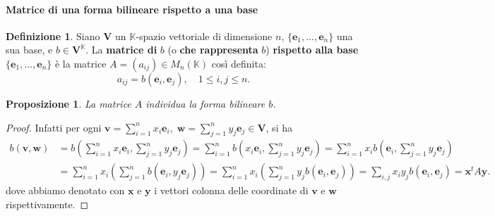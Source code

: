 \documentclass{article}
\theoremstyle{plain}
\newtheorem{prop}[thm]{Proposizione}
\theoremstyle{definition}
\newtheorem{defn}{Definizione}[section]
\theoremstyle{remark}
\begin{document}
\vspace{10pt}

\paragraph{Matrice di una forma bilineare rispetto a una base}
\begin{bxthm}
\begin{defn}
Siano $\mathbf{V}$ un $\mathbb{K}$-spazio vettoriale di dimensione $n$, $\{\mathbf{e}_1, \ldots, \mathbf{e}_n\}$ una sua base, 
e $b\in\mathbf{V}^{\mathbb{K}}$. 
La \textbf{matrice di} $b$ (o \textbf{che rappresenta} $b$) \textbf{rispetto alla base} $\{\mathbf{e}_1, \ldots, \mathbf{e}_n\}$ 
è la matrice $A = (a_{ij}) \in M_n(\mathbb{K})$ così definita:
\[
a_{ij} = b(\mathbf{e}_i, \mathbf{e}_j), \quad 1 \leq i,j \leq n.
\]    
\end{defn}
\end{bxthm}

\vspace{10pt}

\begin{bxthm}
\begin{prop}
La matrice $A$ individua la forma bilineare $b$.    
\end{prop}
\end{bxthm}
\begin{proof}
Infatti per ogni $\mathbf{v} = \sum_{i=1}^{n}x_i \mathbf{e}_i,\; \mathbf{w} = \sum_{j=1}^{n}y_j \mathbf{e}_j\in\mathbf{V}$,
si ha
\begin{align*}
b(\mathbf{v}, \mathbf{w}) &= b\left(\sum_{i=1}^{n}x_i \mathbf{e}_i, \sum_{j=1}^{n}y_j \mathbf{e}_j\right)=\sum_{i=1}^{n}b\left(x_i\mathbf{e}_i,\sum_{j=1}^{n}y_j \mathbf{e}_j\right)=\sum_{i=1}^{n}x_ib\left(\mathbf{e}_i,\sum_{j=1}^{n}y_j \mathbf{e}_j\right)\\
&=\sum_{i=1}^{n}x_i\left(\sum_{j=1}^{n}b\left(\mathbf{e}_i,y_j \mathbf{e}_j\right)\right)=\sum_{i=1}^{n}x_i\left(\sum_{j=1}^{n}y_jb\left(\mathbf{e}_i, \mathbf{e}_j\right)\right)= \sum_{i,j} x_i y_j b(\mathbf{e}_i, \mathbf{e}_j) = \mathbf{x}^t A \mathbf{y}.
\end{align*}
dove abbiamo denotato con $\mathbf{x}$ e $\mathbf{y}$ i vettori colonna delle coordinate di $\mathbf{v}$ e $\mathbf{w}$ rispettivamente.    
\end{proof}

\vspace{10pt}
\end{document}
